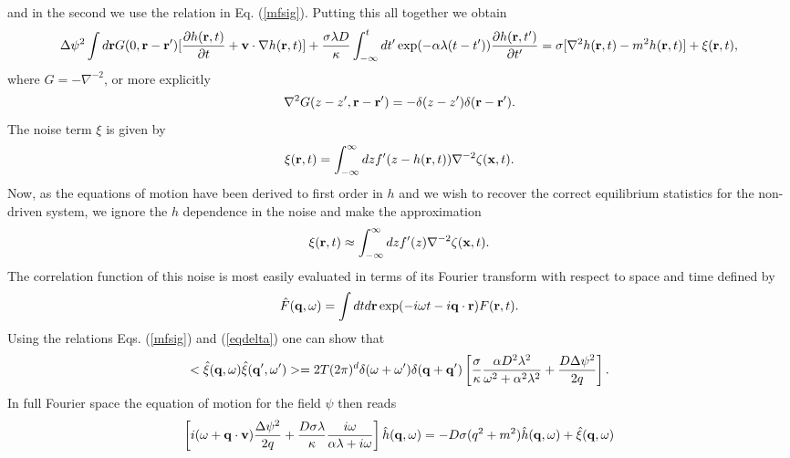 and in the second we use the relation in Eq. (\ref{mfsig}). Putting this all together we obtain
\begin{equation}
    \Delta\psi^2 \int d{\bf r} G(0,{\bf r}-{\bf r}') [\frac{\partial h({\bf r},t)}{\partial t} +{\bf v}\cdot\nabla h({\bf r},t)] +\frac{\sigma\lambda D}{\kappa}\int_{-\infty}^t dt'
\exp(-\alpha\lambda(t-t'))\frac{\partial h({\bf r},t')}{\partial t'}
= \sigma[\nabla^2 h({\bf r},t)-m^2 h({\bf r},t)] + \xi({\bf r},t),
    \label{em}
\end{equation}
where $G= -\nabla^{-2}$, or more explicitly
\begin{equation}
    \nabla^2 G(z-z',{\bf r}-{\bf r}') = -\delta(z-z') \delta({\bf r}-{\bf r'}).
\end{equation}
The noise term $\xi$ is given by
\begin{equation}
    \xi({\bf r},t) = \int_{-\infty}^{\infty} dz f'(z-h({\bf r},t)) \nabla^{-2} \zeta({\bf x},t).
\end{equation}
Now, as the equations of motion have been derived to first order in $h$ and we wish to recover the correct equilibrium statistics for the non-driven system, we ignore the $h$ dependence in the noise and make the approximation
\begin{equation}
    \xi({\bf r},t) \approx \int_{-\infty}^{\infty} dz f'(z) \nabla^{-2} \zeta({\bf x},t).
\end{equation}
The correlation function of this noise is most easily evaluated in terms of its Fourier transform with respect to  space and time  defined by
\begin{equation}
    \hat F({\bf q},\omega)=\int dt d{\bf r}\exp(-i\omega t -i{\bf q}\cdot{\bf r}) F({\bf r},t).
\end{equation}
Using the relations Eqs. (\ref{mfsig}) and (\ref{eqdelta}) one  can show that
\begin{equation}
    < \hat \xi({\bf q},\omega)\hat \xi({\bf q}',\omega')> =2T(2\pi)^d \delta(\omega +\omega') \delta({\bf q}+{\bf q}') \left[ \frac{\sigma}{\kappa}\frac{\alpha D^2\lambda^2}{\omega^2 +\alpha^2\lambda^2} + \frac{D\Delta\psi^2}{2q}\right].
\end{equation}
In full Fourier space the equation of motion for the field $\psi$ then reads
\begin{equation}
    \left[i(\omega+{\bf q}\cdot{\bf v})\frac{\Delta\psi^2}{2q} + \frac{D\sigma\lambda}{\kappa} \frac{i\omega}{\alpha\lambda+i\omega}\right] \hat h({\bf q},\omega)= -D\sigma(q^2+m^2)\hat h({\bf q},\omega)+ \hat\xi({\bf q},\omega)
    \label{dyn}
\end{equation}

